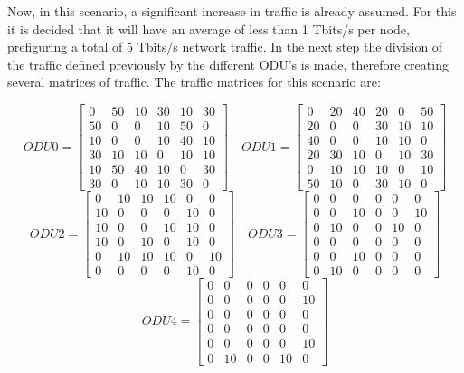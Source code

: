 Now, in this scenario, a significant increase in traffic is already assumed. For this it is decided that it will have an average of less than 1 Tbits/s per node, prefiguring a total of 5 Tbits/s network traffic.
In the next step the division of the traffic defined previously by the different ODU's is made, therefore creating several matrices of traffic.
The traffic matrices for this scenario are:

\[
ODU0=
  \begin{bmatrix}
    0 & 50 & 10 & 30 & 10 & 30 \\
    50 & 0 & 0 & 10 & 50 & 0 \\
    10 & 0 & 0 & 10 & 40 & 10 \\
    30 & 10 & 10 & 0 & 10 & 10 \\
    10 & 50 & 40 & 10 & 0 & 30 \\
    30 & 0 & 10 & 10 & 30 & 0
  \end{bmatrix}
\quad ODU1=
  \begin{bmatrix}
    0 & 20 & 40 & 20 & 0 & 50 \\
    20 & 0 & 0 & 30 & 10 & 10 \\
    40 & 0 & 0 & 10 & 10 & 0 \\
    20 & 30 & 10 & 0 & 10 & 30 \\
    0 & 10 & 10 & 10 & 0 & 10 \\
    50 & 10 & 0 & 30 & 10 & 0
  \end{bmatrix}
\]
\[
ODU2=
  \begin{bmatrix}
    0 & 10 & 10 & 10 & 0 & 0 \\
    10 & 0 & 0 & 0 & 10 & 0 \\
    10 & 0 & 0 & 10 & 10 & 0 \\
    10 & 0 & 10 & 0 & 10 & 0 \\
    0 & 10 & 10 & 10 & 0 & 10 \\
    0 & 0 & 0 & 0 & 10 & 0
  \end{bmatrix}
\quad ODU3=
  \begin{bmatrix}
    0 & 0 & 0 & 0 & 0 & 0 \\
    0 & 0 & 10 & 0 & 0 & 10 \\
    0 & 10 & 0 & 0 & 10 & 0 \\
    0 & 0 & 0 & 0 & 0 & 0 \\
    0 & 0 & 10 & 0 & 0 & 0 \\
    0 & 10 & 0 & 0 & 0 & 0
  \end{bmatrix}
\]
\[
ODU4=
  \begin{bmatrix}
    0 & 0 & 0 & 0 & 0 & 0 \\
    0 & 0 & 0 & 0 & 0 & 10 \\
    0 & 0 & 0 & 0 & 0 & 0 \\
    0 & 0 & 0 & 0 & 0 & 0 \\
    0 & 0 & 0 & 0 & 0 & 10 \\
    0 & 10 & 0 & 0 & 10 & 0
  \end{bmatrix}
\]

